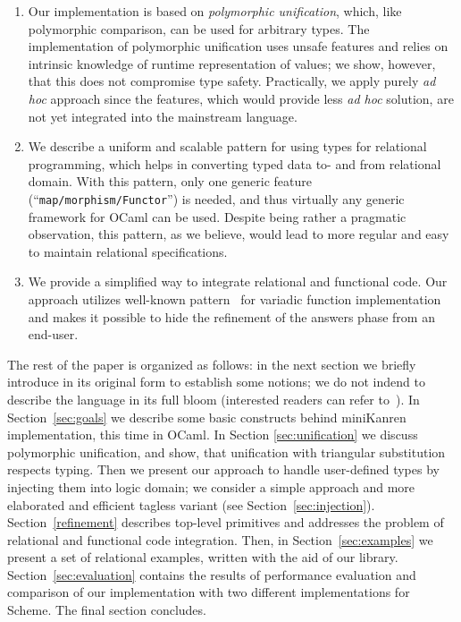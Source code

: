 \begin{enumerate}
\item Our implementation is based on \emph{polymorphic unification}, which, like polymorphic comparison,
can be used for arbitrary types. The implementation of polymorphic unification uses unsafe features and
relies on intrinsic knowledge of runtime representation of values; we show, however, that this does not
compromise type safety. Practically, we apply purely \emph{ad hoc} approach since the features, 
which would provide less \emph{ad hoc} solution, are not yet integrated into the mainstream language.

\item We describe a uniform and scalable pattern for using types for relational programming, which
helps in converting typed data to- and from relational domain. With this pattern, only one
generic feature (``\lstinline{map/morphism/Functor}'') is needed, and thus virtually any generic 
framework for OCaml can be used. Despite being rather a pragmatic observation, this pattern, as we
believe, would lead to  more regular and easy to maintain relational specifications.

\item We provide a simplified way to integrate relational and functional code. Our approach utilizes
well-known pattern~\cite{Unparsing, DoWeNeed} for variadic function implementation and makes it
possible to hide the refinement of the answers phase from an end-user.
\end{enumerate}

The rest of the paper is organized as follows: in the next section we briefly introduce \miniKanren in
its original form to establish some notions; we do not indend to describe the language in its full bloom (interested readers can
refer to~\cite{TRS}). In Section~\ref{sec:goals} we describe some basic constructs behind miniKanren implementation, this time 
in OCaml. In Section \ref{sec:unification} we discuss polymorphic unification, and show, that unification with 
triangular substitution respects typing. Then we present our approach to handle user-defined types by injecting them 
into logic domain; we consider a simple approach and more elaborated and efficient tagless variant (see Section~\ref{sec:injection}). 
Section~\ref{refinement} describes top-level primitives and addresses the problem of relational and functional code integration. 
Then, in Section~\ref{sec:examples} we present a set of relational examples, written with the aid of our 
library. Section~\ref{sec:evaluation} contains the results of performance evaluation and comparison of our implementation 
with two different implementations for Scheme. The final section concludes.

